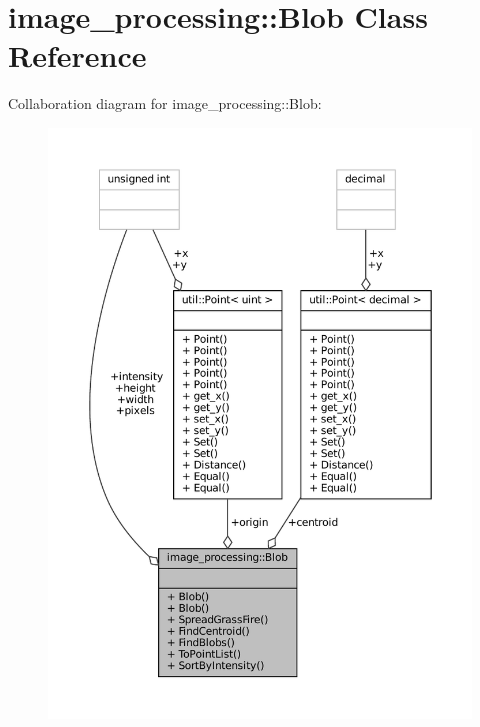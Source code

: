 \hypertarget{classimage__processing_1_1Blob}{}\section{image\+\_\+processing\+:\+:Blob Class Reference}
\label{classimage__processing_1_1Blob}


Collaboration diagram for image\+\_\+processing\+:\+:Blob\+:
\nopagebreak
\begin{figure}[H]
\begin{center}
\leavevmode
\includegraphics[width=350pt]{classimage__processing_1_1Blob__coll__graph}
\end{center}
\end{figure}
